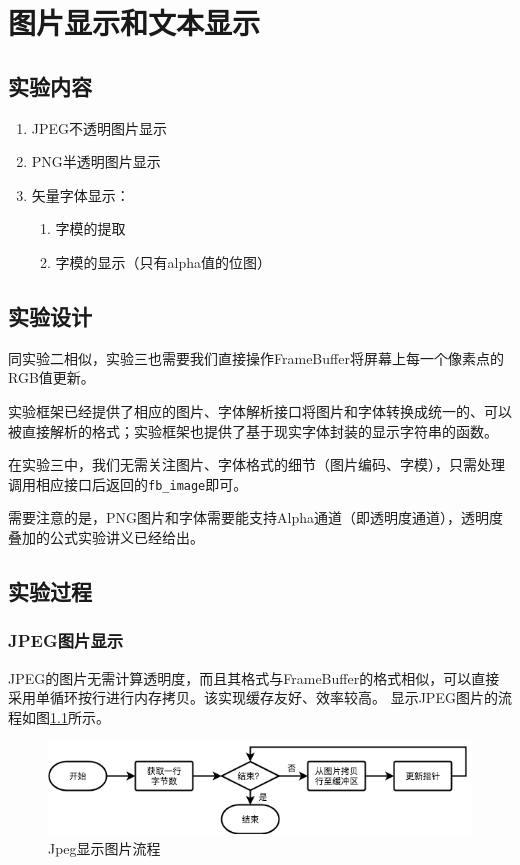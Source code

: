 \documentclass{report}
\begin{document}
\chapter{图片显示和文本显示}
\section{实验内容}

\begin{enumerate}
    \item JPEG不透明图片显示
    \item PNG半透明图片显示
    \item 矢量字体显示：
        \begin{enumerate}
            \item 字模的提取
            \item 字模的显示（只有alpha值的位图）
        \end{enumerate}
\end{enumerate}

\section{实验设计}

\par 同实验二相似，实验三也需要我们直接操作FrameBuffer将屏幕上每一个像素点的RGB值更新。
\par 实验框架已经提供了相应的图片、字体解析接口将图片和字体转换成统一的、可以被直接解析的格式；实验框架也提供了基于现实字体封装的显示字符串的函数。
\par 在实验三中，我们无需关注图片、字体格式的细节（图片编码、字模），只需处理调用相应接口后返回的\lstinline|fb_image|即可。
\par 需要注意的是，PNG图片和字体需要能支持Alpha通道（即透明度通道），透明度叠加的公式实验讲义已经给出。

\section{实验过程}
\subsection{JPEG图片显示}
\par JPEG的图片无需计算透明度，而且其格式与FrameBuffer的格式相似，可以直接采用单循环按行进行内存拷贝。该实现缓存友好、效率较高。 显示JPEG图片的流程如图\ref{fig:jpeg}所示。
\begin{figure}[htpb]
    \centering
    \includegraphics[width=0.6\linewidth]{jpeg.png}
    \caption{Jpeg显示图片流程}
    \label{fig:jpeg}
\end{figure}
\end{document}
